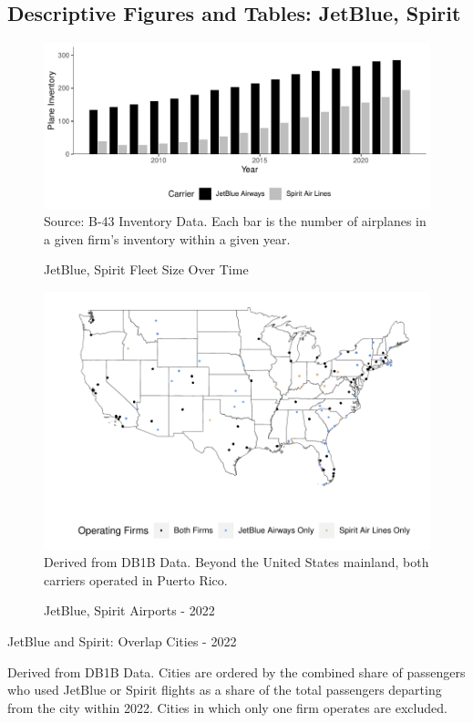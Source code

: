 \documentclass{article}
\begin{document}
\begin{appendices}
	\subsection{Descriptive Figures and Tables: JetBlue, Spirit}
	\begin{figure}
	\caption{JetBlue, Spirit Fleet Size Over Time}
	\label{fig:Both_fleet}
	\includegraphics[width = \linewidth]{Both_Planes.pdf}
	\footnotesize{Source: B-43 Inventory Data. Each bar is the number of airplanes in a given firm's inventory within a given year.}
\end{figure}

\begin{figure}
	\caption{JetBlue, Spirit Airports - 2022}
	\label{fig:JBSpirit_Airports_2022}
	\includegraphics[width = \linewidth]{Map_Mainland_Both_2022.pdf}
	\footnotesize{Derived from DB1B Data. Beyond the United States mainland, both carriers operated in Puerto Rico.}
\end{figure}


	\begin{table}
		\caption{JetBlue and Spirit: Overlap Cities - 2022}
		\label{tab:KeyCities}
		
		\footnotesize{Derived from DB1B Data. Cities are ordered by the combined share of passengers who used JetBlue or Spirit flights as a share of the total passengers departing from the city within 2022. Cities in which only one firm operates are excluded.}
	\end{table}


\end{appendices}
\end{document}
